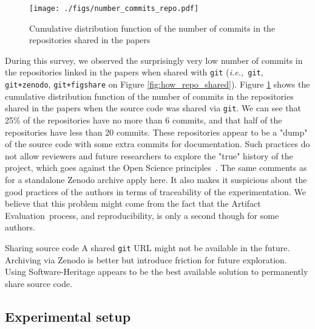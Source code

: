 \documentclass[sigconf,natbib=false]{acmart}
\newcommand{\ie}{\emph{i.e.,}}
\newcommand{\aeval}{Artifact Evaluation}
\newcommand{\todo}[1]{{\color{red}{TODO: #1}}}
\begin{document}

\begin{figure}
  \centering
  \texttt{[image: ./figs/number\_commits\_repo.pdf]}
  \caption{Cumulative distribution function of the number of commits in the repositories shared in the papers}\label{fig:number_commits_repo}
\end{figure}

During this survey, we observed the surprisingly very low number of commits in the repositories linked in the papers when shared with \texttt{git} (\ie\ \texttt{git}, \texttt{git+zenodo}, \texttt{git+figshare} on Figure \ref{fig:how_repo_shared}).
Figure \ref{fig:number_commits_repo} shows the cumulative distribution function of the number of commits in the repositories shared in the papers when the source code was shared via \texttt{git}.
We can see that 25\% of the repositories have no more than 6 commits, and that half of the repositories have less than 20 commits.
These repositories appear to be a "dump" of the source code with some extra commits for documentation.
Such practices do not allow reviewers and future researchers to explore the "true" history of the project, which goes against the Open Science principles\ \cite{openscience_unesco}.
The same comments as for a standalone Zenodo archive apply here.
It also makes it suspicious about the good practices of the authors in terms of traceability of the experimentation.
We believe that this problem might come from the fact that the \aeval\ process, and reproducibility, is only a second though for some authors.

\begin{lesson}{Sharing source code}{}
  A shared \texttt{git} URL might not be available in the future.
  Archiving via Zenodo is better but introduce friction for future exploration.
  Using Software-Heritage appears to be the best available solution to permanently share source code.
\end{lesson}

\subsection{Experimental setup}\label{sec:sop:expe}
\end{document}
